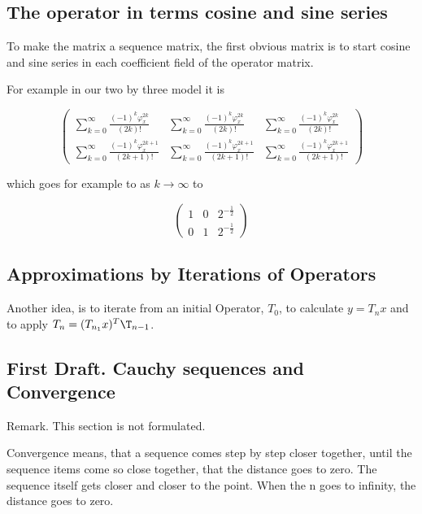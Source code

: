 \documentclass[a4paper]{article}
\begin{document}
\subsection{The operator in terms cosine and sine series}

To make the matrix a sequence matrix, the first obvious matrix is to start cosine and sine series in each coefficient field of the operator matrix. 

For example in our two by three model it is 

\begin{displaymath}
\begin{pmatrix}
	\sum_{k=0}^{\infty} \frac{(-1)^{k}\varphi_{x}^{2k}}{(2k)!} &
	\sum_{k=0}^{\infty} \frac{(-1)^{k}\varphi_{x}^{2k}}{(2k)!} &
	\sum_{k=0}^{\infty} \frac{(-1)^{k}\varphi_{x}^{2k}}{(2k)!} \\
	\sum_{k=0}^{\infty} \frac{(-1)^{k}\varphi_{x}^{2k+1}}{(2k+1)!} &
	\sum_{k=0}^{\infty} \frac{(-1)^{k}\varphi_{x}^{2k+1}}{(2k+1)!} &
	\sum_{k=0}^{\infty} \frac{(-1)^{k}\varphi_{x}^{2k+1}}{(2k+1)!} 
\end{pmatrix}
\end{displaymath}
	
	which goes for example to as $k \rightarrow \infty$ to 

\begin{displaymath}
\begin{pmatrix}
	1&0&2^{-\frac12}\\
	0&1&2^{-\frac12}
\end{pmatrix}
\end{displaymath}



\subsection{Approximations by Iterations of Operators}

Another idea, is to iterate from an initial Operator, $T_0$, to calculate $y=T_n x$ and to apply $T_n = (T_{n_1}x)^T \T_{n-1}$.



\subsection{First Draft. Cauchy sequences and Convergence}

Remark. This section is not formulated.

Convergence means, that a sequence comes step by step closer together, until the sequence items come so close together, that the distance goes to zero. The sequence itself gets closer and closer to the point. When the n goes to infinity, the distance goes to zero.\\
\end{document}
